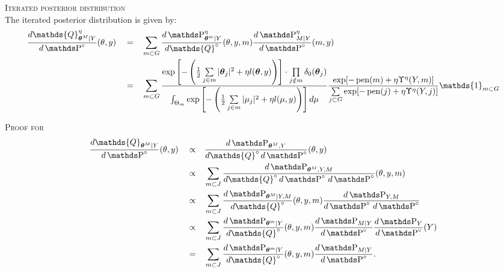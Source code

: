 \begin{pr}{\textsc{Iterated posterior distribution} \\}\label{PR_BAYES_HIERARCHICAL_ITER}
The iterated posterior distribution is given by:
\begin{alignat*}{3}
& \frac{d\mathds{Q}_{\boldsymbol{\theta}^{M} \vert Y}^{\eta}}{d\P^{\circ}}(\theta, y) && = && \sum\limits_{m \subset G} \frac{d\P_{\boldsymbol{\theta}^{m} \vert Y}^{\eta}}{d\mathds{Q}^{\circ}}(\theta, y, m) \frac{d\P_{M \vert Y}^{\eta}}{d\P^{\circ}}(m, y)\\
& && = && \sum\limits_{m \subset G} \frac{\exp\left[-\left(\frac{1}{2}\sum\limits_{j \in m} \vert \boldsymbol{\theta}_{j} \vert^{2} + \eta l(\boldsymbol{\theta}, y)\right)\right] \cdot \prod\limits_{j \notin m} \delta_{0}(\boldsymbol{\theta}_{j})}{\int_{\Theta_{m}} \exp\left[-\left(\frac{1}{2}\sum\limits_{j \in m} \vert \mu_{j} \vert^{2} + \eta l(\mu, y)\right)\right] d\mu} \frac{\exp[-\pen(m) + \eta \Upsilon^{\eta}(Y, m)]}{\sum\limits_{j \subset G}\exp[- \pen(j) + \eta \Upsilon^{\eta}(Y, j)]} \mathds{1}_{m \subset G}\\
\end{alignat*}
\end{pr}

\begin{pro}{\textsc{Proof for  \\}}\label{PRO_BAYES_HIERARCHICAL_ITER}
\begin{alignat*}{3}
&\frac{d\mathds{Q}_{\boldsymbol{\theta}^{M} \vert Y}}{d\P^{\circ}}(\theta, y) && \propto && \frac{d\P_{\boldsymbol{\theta}^{M}, Y}}{d\mathds{Q}^{\circ} \, d\P^{\circ}}(\theta, y)\\
& &&\propto&& \sum\limits_{m \subset J} \frac{d\P_{\boldsymbol{\theta}^{M}, Y, M}}{d\mathds{Q}^{\circ} \, d\P^{\circ} \, d\P^{\circ}}(\theta, y, m)\\
& &&\propto&& \sum\limits_{m \subset J} \frac{d\P_{\boldsymbol{\theta}^{M} \vert Y, M}}{d\mathds{Q}^{\circ}}(\theta, y, m) \frac{d\P_{Y, M}}{d\P^{\circ} \, d\P^{\circ}}\\
& &&\propto&& \sum\limits_{m \subset J} \frac{d\P_{\boldsymbol{\theta}^{m} \vert Y}}{d\mathds{Q}^{\circ}}(\theta, y, m) \frac{d\P_{M \vert Y}}{d\P^{\circ}} \frac{d\P_{Y}}{d\P^{\circ}}(Y)\\
& &&=&& \sum\limits_{m \subset J} \frac{d\P_{\boldsymbol{\theta}^{m} \vert Y}}{d\mathds{Q}^{\circ}}(\theta, y, m) \frac{d\P_{M \vert Y}}{d\P^{\circ}}.
\end{alignat*}
\qedsymbol
\end{pro}


